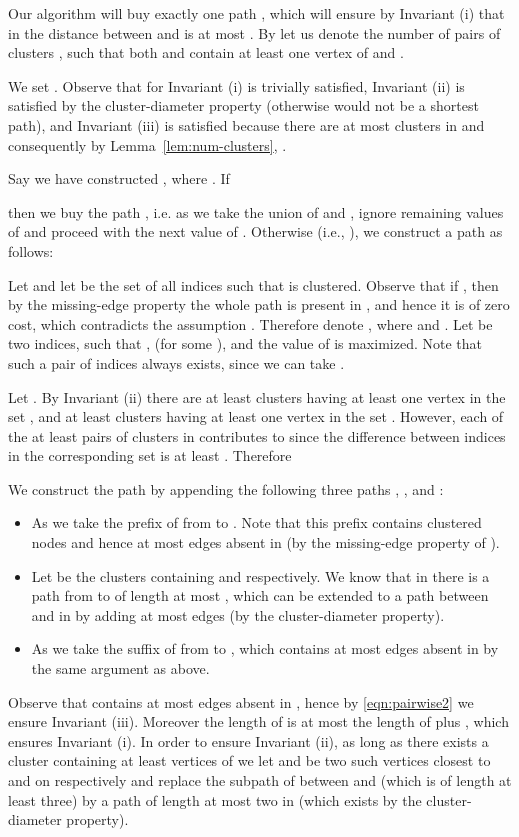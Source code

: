\documentclass[a4paper,11pt]{article}
\theoremstyle{definition}
\begin{document}
\smallskip\noindent Our algorithm will buy exactly one path , which will ensure by Invariant (i) that 
in  the distance between  and  is at most .
By  let us denote the number 
of pairs of clusters , such that both  and  contain at
least one vertex of  and .

We set .
Observe that for  Invariant (i) is trivially satisfied,
Invariant (ii) is satisfied by the cluster-diameter property 
(otherwise  would not be a shortest path),
and Invariant (iii) is satisfied because there are at most  clusters in 
and consequently by Lemma~\ref{lem:num-clusters}, . 

Say we have constructed , where .
If

then we buy the path ,
i.e. as  we take the union of  and ,
ignore remaining values of  and proceed with the next value of .
Otherwise (i.e., ), 
we construct a path  as follows:


Let 
and let  be the set of all indices
 such that  is clustered.
Observe that if , then by the missing-edge property
the whole path  is present in , and hence it 
is of zero cost, which contradicts the assumption
.
Therefore denote , where  and . Let  be two indices,
such that ,  (for some ),
 and the value of  is maximized.
Note that such a pair of indices  always exists, since we can take .

Let . By Invariant (ii) there are at least  clusters  having at least 
one vertex in the set ,
and at least  clusters  having at least one vertex 
in the set .
However, each of the at least  pairs of clusters in  contributes to  since the difference between indices in the corresponding set is at least 
.
Therefore 



We construct the path  by appending the following three
paths , , and :
\begin{itemize}
  \item As  we take the prefix of  from  to .
  Note that this prefix contains  clustered nodes and hence at most  edges absent 
  in  (by the missing-edge property of ).
  \item Let  be the clusters containing  and  respectively.
  We know that in  there is a path from  to  of length at most ,
  which can be extended to a path  between  and  in  by adding at most  edges
  (by the cluster-diameter property).
  \item As  we take the suffix of  from  to ,
  which contains at most  edges absent in  by the same argument as above.
\end{itemize}
Observe that  contains at most  edges absent in , hence by \eqref{eqn:pairwise2} we ensure Invariant (iii).
Moreover the length of  is at most the length of  plus , which ensures Invariant (i).
In order to ensure Invariant (ii), as long as there exists a cluster 
containing at least  vertices of  we let
 and  be two such vertices closest to  and  on  respectively
and replace the subpath of  between  and  (which is of length at least three)
by a path of length at most two in  (which exists by  the cluster-diameter property).
\end{document}
